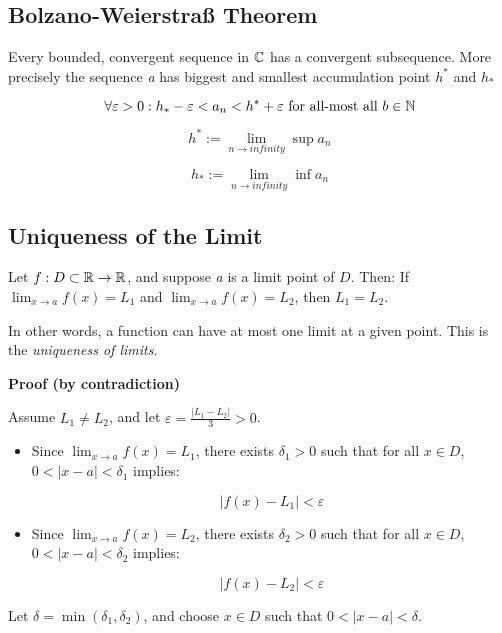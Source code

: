 \subsection{Bolzano-Weierstraß Theorem}

Every bounded, convergent sequence in \(\mathbb{C}\) has a convergent subsequence.
More precisely the sequence \emph{a} has biggest and smallest accumulation point \(h^*\) and \(h_*\)

\[
    \forall \varepsilon > 0 : h_* - \varepsilon < a_n < h^{*} + \varepsilon \text{ for all-most all } 
    b \in \mathbb{N}
\]

\[
    h^* := \lim_{n \to infinity} \sup a_n
\]

\[
    h_* := \lim_{n \to infinity} \inf a_n
\]

\subsection{Uniqueness of the Limit}

Let \( f: D \subset \mathbb{R} \to \mathbb{R} \), and suppose \emph{a} is a limit point of \( D \). Then:
If \( \lim_{x \to a} f(x) = L_1 \) and \( \lim_{x \to a} f(x) = L_2 \), then \( L_1 = L_2 \).
\vspace{\baselineskip}

In other words, a function can have at most one limit at a given point. This is the \emph{uniqueness of limits}.

\textbf{Proof (by contradiction)}

Assume \( L_1 \ne L_2 \), and let \( \varepsilon = \frac{|L_1 - L_2|}{3} > 0 \).

\begin{itemize}

    \item Since \( \lim_{x \to a} f(x) = L_1 \), there exists \( \delta_1 > 0 \) such that for all \( x \in D \), \( 0 < |x - a| < \delta_1 \) implies:

    \[
        |f(x) - L_1| < \varepsilon
    \]
    
    \item Since \( \lim_{x \to a} f(x) = L_2 \), there exists \( \delta_2 > 0 \) such that for all \( x \in D \), \( 0 < |x - a| < \delta_2 \) implies:

    \[
        |f(x) - L_2| < \varepsilon
    \]

\end{itemize}

Let \( \delta = \min(\delta_1, \delta_2) \), and choose \( x \in D \) such that \( 0 < |x - a| < \delta \).

